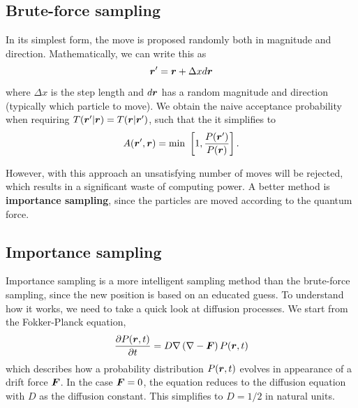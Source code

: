 \subsection{Brute-force sampling} \label{sec:bruteforce}
In its simplest form, the move is proposed randomly both in magnitude and direction. Mathematically, we can write this as
\begin{equation}
\boldsymbol{{r}}'=\boldsymbol{{r}}+\Delta xd\boldsymbol{{r}}
\end{equation}
where $\Delta x$ is the step length and $d\boldsymbol{{r}}$ has a random magnitude and direction (typically which particle to move). We obtain the naive acceptance probability when requiring $T(\boldsymbol{{r}}'|\boldsymbol{{r}})=T(\boldsymbol{{r}}|\boldsymbol{{r}}')$, such that the it simplifies to
\begin{equation}
A(\boldsymbol{{r}}',\boldsymbol{{r}})=\text{min }\left[1,\frac{P(\boldsymbol{{r}}')}{P(\boldsymbol{{r}})}\right].
\end{equation}

However, with this approach an unsatisfying number of moves will be rejected, which results in a significant waste of computing power. A better method is \textbf{importance sampling}, since the particles are moved according to the quantum force. 

\subsection{Importance sampling} \label{sec:importancesampling}
Importance sampling is a more intelligent sampling method than the brute-force sampling, since the new position is based on an educated guess. To understand how it works, we need to take a quick look at diffusion processes. We start from the Fokker-Planck equation,
\begin{equation}
\frac{\partial P(\boldsymbol{{r}},t)}{\partial t}=D\nabla\left(\nabla-\boldsymbol{{F}}\right)P(\boldsymbol{{r}},t)
\end{equation}
which describes how a probability distribution $P(\boldsymbol{{r}},t)$ evolves in appearance of a drift force $\boldsymbol{{F}}$. In the case $\boldsymbol{{F}}=0$, the equation reduces to the diffusion equation with $D$ as the diffusion constant. This simplifies to $D=1/2$ in natural units. 


